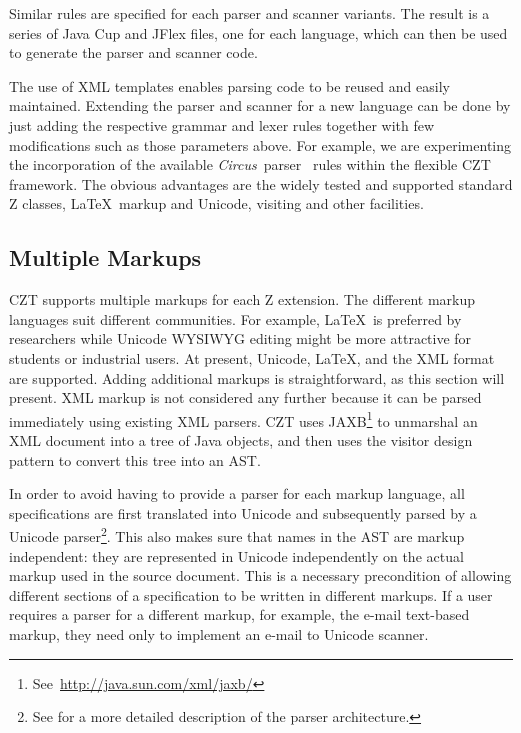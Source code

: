 \documentclass{llncs}
\newcommand{\Circus}{{\sf\slshape Circus}}
\begin{document}
Similar rules are specified for each parser and scanner variants. The
result is a series of Java Cup and JFlex files, one for each language,
which can then be used to generate the parser and scanner code.

The use of XML templates enables parsing code to be reused and easily
maintained.  Extending the parser and scanner for a new language can
be done by just adding the respective grammar and lexer rules together
with few modifications such as those parameters above.  For example,
we are experimenting the incorporation of the available \Circus\
parser~\cite{circus.other:parser} rules within the flexible CZT
framework. The obvious advantages are the widely tested and supported
standard Z classes, \LaTeX\ markup and Unicode, visiting and other
facilities.

\subsection{Multiple Markups}\label{multiple-markups}

 CZT supports multiple markups for each Z extension.  The different
 markup languages suit different communities.  For example, \LaTeX\ is
 preferred by researchers while Unicode WYSIWYG editing might be more
 attractive for students or industrial users. At present, Unicode,
 \LaTeX, and the XML format are supported.  Adding additional markups
 is straightforward, as this section will present.  XML markup is not
 considered any further because it can be parsed immediately using
 existing XML parsers.  CZT uses
 JAXB\footnote{See~\url{http://java.sun.com/xml/jaxb/}} to unmarshal an
 XML document into a tree of Java objects, and then uses the visitor
 design pattern to convert this tree into an AST.

In order to avoid having to provide a parser for each markup language,
all specifications are first translated into Unicode and subsequently
parsed by a Unicode parser\footnote{See \cite{czt} for a more detailed
description of the parser architecture.}.  This also makes sure that
names in the AST are markup independent: they are represented in
Unicode independently on the actual markup used in the source
document.  This is a necessary precondition of allowing different
sections of a specification to be written in different markups.  If a
user requires a parser for a different markup, for example, the e-mail
text-based markup, they need only to implement an e-mail to Unicode
scanner.
\end{document}
